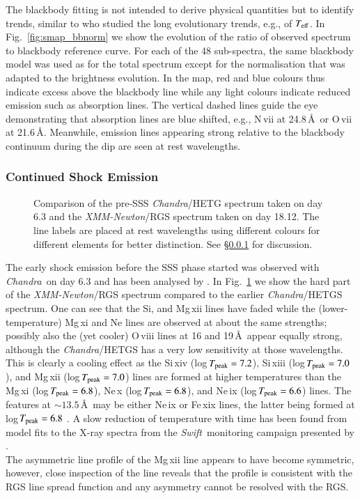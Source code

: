 \documentclass{aa}
\newcommand{\chandra}{{\it Chandra}}
\newcommand{\swift}{{\it Swift}}
\newcommand{\xmm}{{\it XMM-Newton}}
\begin{document}
The blackbody fitting is not intended to derive physical quantities but
to identify trends, similar to \cite{page20} who studied the long
evolutionary trends, e.g., of $T_{\rm eff}$. In
Fig.~\ref{fig:smap_bbnorm} we show the evolution of the ratio of observed
spectrum to blackbody reference curve. For each of the 48 sub-spectra,
the same blackbody model was used as for the total spectrum except for the
normalisation that was adapted to the brightness evolution. In the map, red and blue
colours thus indicate excess above the blackbody line while any light
colours indicate reduced emission such as absorption lines. The vertical
dashed lines guide the eye demonstrating that absorption lines are blue
shifted, e.g., N\,{\sc vii} at 24.8\,\AA\ or O\,{\sc vii} at 21.6\,\AA.
Meanwhile, emission lines appearing strong relative to the blackbody
continuum during the dip are seen at rest wavelengths.\\

\subsubsection{Continued Shock Emission}
\label{sect:descr:shock}

\begin{figure}[!ht]
\caption{\label{fig:shock}Comparison of the pre-SSS \chandra/HETG
spectrum taken on day 6.3 \citep[ObsID 22845;][]{orio2020} and the
\xmm/RGS spectrum taken on day 18.12. The line labels are placed
at rest wavelengths using different colours for different elements
for better distinction. See \S\ref{sect:descr:shock} for discussion.
}
\end{figure}

The early shock emission before the SSS phase started was observed
with \chandra\ on day 6.3 and has been analysed by \cite{orio2020}.
In Fig.~\ref{fig:shock} we show the hard part of the \xmm/RGS spectrum
compared to the earlier \chandra/HETGS spectrum. One can see that
the Si, and Mg\,{\sc xii} lines have faded while the (lower-temperature)
Mg\,{\sc xi} and Ne lines are observed at about the same strengths;
possibly also the (yet cooler) O\,{\sc viii} lines at 16 and 19\,\AA\
appear equally strong, although the \chandra/HETGS has a very low
sensitivity at those wavelengths.
This is clearly a cooling effect as the Si\,{\sc xiv}
(log\,$T_{\rm peak}=7.2$), Si\,{\sc xiii} (log\,$T_{\rm peak}=7.0$),
and Mg\,{\sc xii} (log\,$T_{\rm peak}=7.0$) lines are formed at higher
temperatures than the Mg\,{\sc xi} (log\,$T_{\rm peak}=6.8$),
Ne\,{\sc x} (log\,$T_{\rm peak}=6.8$), and Ne\,{\sc ix}
(log\,$T_{\rm peak}=6.6$) lines. The features at $\sim 13.5$\,\AA\
may be either Ne\,{\sc ix} or Fe\,{\sc xix} lines, the latter being
formed at log\,$T_{\rm peak}=6.8$ \citep{nebr}.
A slow reduction of temperature with time has been found from model
fits to the X-ray spectra from the \swift\ monitoring campaign
presented by \cite{page20}.\\
The asymmetric line profile of the Mg\,{\sc xii} line appears to have become
symmetric, however, close inspection of the line reveals that the profile
is consistent with the RGS line spread function and any asymmetry cannot
be resolved with the RGS.
\end{document}
